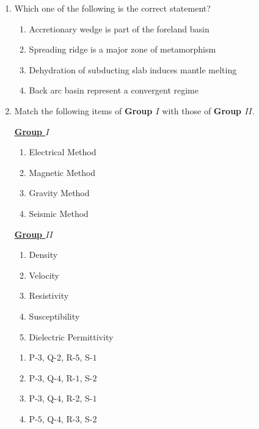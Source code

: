 \documentclass[journal,12pt,onecolumn]{IEEEtran}
\theoremstyle{remark}
\begin{document}
\begin{enumerate}
        \item Which one of the following is the correct statement? \hfill{}
            \begin{enumerate}
                \item Accretionary wedge is part of the foreland basin
                \item Spreading ridge is a major zone of metamorphism
                \item Dehydration of subducting slab induces mantle melting
                \item Back arc basin represent a convergent regime
            \end{enumerate}
            
        \item Match the following items of \textbf{Group $I$} with those of \textbf{Group $II$}. \hfill{}

        \begin{multicols}{2}
            \underline{\textbf{Group $I$}}
            \begin{enumerate}[start =16]
                \item Electrical Method
                \item Magnetic Method
                \item Gravity Method
                \item Seismic Method
            \end{enumerate}

            \columnbreak

            \underline{\textbf{Group $II$}}
            \begin{enumerate}
                \item Density
                \item Velocity
                \item Resistivity
                \item Susceptibility
                \item Dielectric Permittivity
            \end{enumerate}
        \end{multicols}

        \begin{enumerate}
            \item P-$3$, Q-$2$, R-$5$, S-$1$
            \item P-$3$, Q-$4$, R-$1$, S-$2$
            \item P-$3$, Q-$4$, R-$2$, S-$1$
            \item P-$5$, Q-$4$, R-$3$, S-$2$
        \end{enumerate}
        

\end{enumerate}
\end{document}
